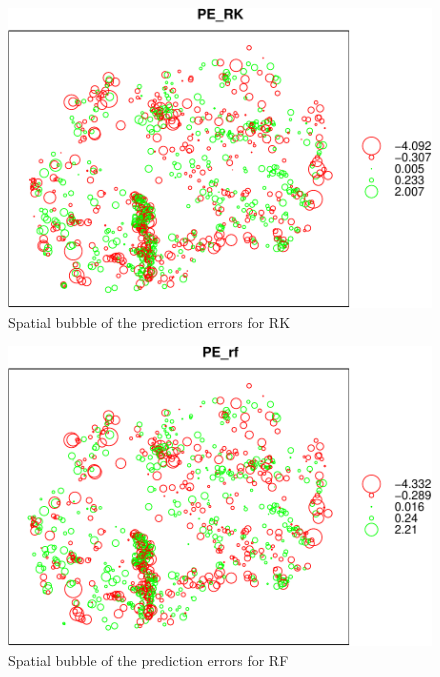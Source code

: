\documentclass[10pt,b5paper,]{book}
\newenvironment{Shaded}{\begin{snugshade}}{\end{snugshade}}
\newcommand{\CommentTok}[1]{\textcolor[rgb]{0.56,0.35,0.01}{\textit{#1}}}
\newcommand{\DataTypeTok}[1]{\textcolor[rgb]{0.13,0.29,0.53}{#1}}
\newcommand{\DecValTok}[1]{\textcolor[rgb]{0.00,0.00,0.81}{#1}}
\newcommand{\KeywordTok}[1]{\textcolor[rgb]{0.13,0.29,0.53}{\textbf{#1}}}
\newcommand{\NormalTok}[1]{#1}
\newcommand{\OperatorTok}[1]{\textcolor[rgb]{0.81,0.36,0.00}{\textbf{#1}}}
\newcommand{\StringTok}[1]{\textcolor[rgb]{0.31,0.60,0.02}{#1}}
\theoremstyle{definition}
\theoremstyle{definition}
\theoremstyle{definition}
\theoremstyle{remark}
\begin{document}
\begin{figure}
\includegraphics[width=0.6\linewidth]{SOCMapping_files/figure-latex/unnamed-chunk-88-1} \caption{Spatial bubble of the prediction errors for RK}\label{fig:unnamed-chunk-88}
\end{figure}

\begin{Shaded}
\end{Shaded}

\begin{figure}
\includegraphics[width=0.6\linewidth]{SOCMapping_files/figure-latex/unnamed-chunk-89-1} \caption{Spatial bubble of the prediction errors for RF}\label{fig:unnamed-chunk-89}
\end{figure}

\begin{Shaded}
\end{Shaded}
\end{document}
